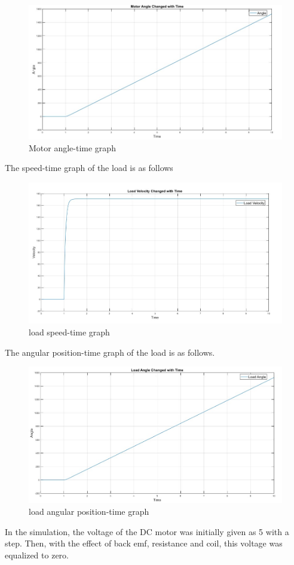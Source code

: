 \begin{figure}[H]
    \centering
    \includegraphics[width=0.7\columnwidth]{imgs/io/e.jpg}
    \caption[Motor angle-time graph]{Motor angle-time graph}
    \label{fig-magnitude}
\end{figure}%

The speed-time graph of the load is as follows
\begin{figure}[H]
    \centering
    \includegraphics[width=0.7\columnwidth]{imgs/io/f.jpg}
    \caption[load speed-time graph]{load speed-time graph}
    \label{fig-magnitude}
\end{figure}%

The angular position-time graph of the load is as follows.
\begin{figure}[H]
    \centering
    \includegraphics[width=0.7\columnwidth]{imgs/io/g.jpg}
    \caption[load angular position-time graph]{load angular position-time graph}
    \label{fig-magnitude}
\end{figure}%

In the simulation, the voltage of the DC motor was initially given as 5 with a step. Then, with
the effect of back emf, resistance and coil, this voltage was equalized to zero.

